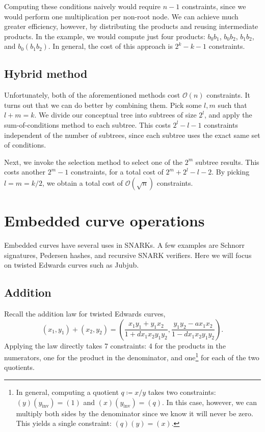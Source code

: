 \documentclass{article}
\begin{document}
Computing these conditions naively would require $n - 1$ constraints, since we would perform one multiplication per non-root node. We can achieve much greater efficiency, however, by distributing the products and reusing intermediate products. In the example, we would compute just four products: $b_0 b_1$, $b_0 b_2$, $b_1 b_2$, and $b_0 (b_1 b_2)$. In general, the cost of this approach is $2^k - k - 1$ constraints.


\subsection{Hybrid method}

Unfortunately, both of the aforementioned methods cost $\mathcal{O}(n)$ constraints. It turns out that we can do better by combining them. Pick some $l, m$ such that $l + m = k$. We divide our conceptual tree into subtrees of size $2^l$, and apply the sum-of-conditions method to each subtree. This costs $2^l - l - 1$ constraints independent of the number of subtrees, since each subtree uses the exact same set of conditions.

Next, we invoke the selection method to select one of the $2^m$ subtree results. This costs another $2^m - 1$ constraints, for a total cost of $2^m + 2^l - l - 2$. By picking $l = m = k/2$, we obtain a total cost of $\mathcal{O}(\sqrt{n})$ constraints.


\section{Embedded curve operations}

Embedded curves have several uses in SNARKs. A few examples are Schnorr signatures, Pedersen hashes, and recursive SNARK verifiers.
Here we will focus on twisted Edwards curves such as Jubjub.


\subsection{Addition}

Recall the addition law for twisted Edwards curves,
\begin{equation}
  (x_1, y_1) + (x_2, y_2) = \left( \frac{x_1 y_1 + y_1 x_2}{1 + d x_1 x_2 y_1 y_2}, \frac{y_1 y_2 - a x_1 x_2}{1 - d x_1 x_2 y_1 y_2} \right).
\end{equation}
Applying the law directly takes 7 constraints: 4 for the products in the numerators, one for the product in the denominator, and one\footnote{In general, computing a quotient $q \coloneqq x / y$ takes two constraints: $(y) (y_\mathrm{inv}) = (1)$ and $(x) (y_\mathrm{inv}) = (q)$. In this case, however, we can multiply both sides by the denominator since we know it will never be zero. This yields a single constraint: $(q) (y) = (x)$.} for each of the two quotients.
\end{document}
